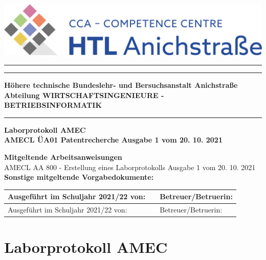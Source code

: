 \documentclass{article}
\newcommand{\startdate}{20. 10. 2021}
\begin{document}
	
	\begin{titlepage}
		\begin{center}
			\includegraphics{../images/logo.png}
			
			\rule{\textwidth}{0.4pt}
			\vspace{1cm}
			\rule{\textwidth}{0.4pt}
			{\large \textbf{Höhere technische Bundeslehr- und Bersuchsanstalt Anichstraße}}
			\vspace{0.5cm}
			{\large \textbf{Abteilung WIRTSCHAFTSINGENIEURE - BETRIEBSINFORMATIK}}
			\rule{\textwidth}{0.4pt}
			
			\vspace{1cm}
			
			\textbf{
					\Large{Laborprotokoll AMEC} \\ \vspace{0.3cm}
					\large{AMECL ÜA01 Patentrecherche Ausgabe 1 vom \startdate}
			}
		\end{center}
			\textbf{Mitgeltende Arbeitsanweisungen} \\
			AMECL AA 800 - Erstellung eines Laborprotokolls Ausgabe 1 vom \startdate \vspace{0.2cm} \\
			\textbf{Sonstige mitgeltende Vorgabedokumente:} \\
			\begin{table}[!ht]
				\centering
				\begin{tabular}{|l|l|l|}
					\hline
					Ausgeführt im Schuljahr 2021/22 von:
					&
					& Betreuer/Betruerin: \\ \hline
					Ausgeführt im Schuljahr 2021/22 von:
					&
					& Betreuer/Betruerin: \\ \hline
				\end{tabular}
			\end{table}
			
	\end{titlepage}
	




\section{Laborprotokoll AMEC}
\end{document}
